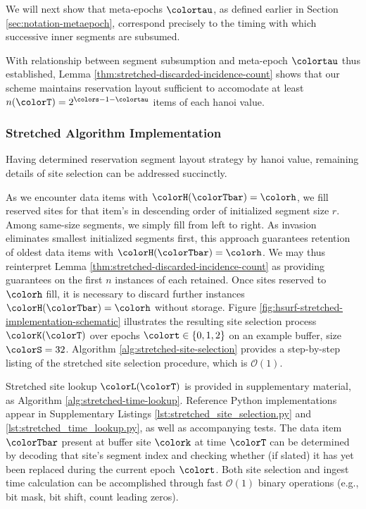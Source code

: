 We will next show that meta-epochs $\colortau$, as defined earlier in Section \ref{sec:notation-metaepoch}, correspond precisely to the timing with which successive inner segments are subsumed.



With relationship between segment subsumption and meta-epoch $\colortau$ thus established, Lemma \ref{thm:stretched-discarded-incidence-count} shows that our scheme maintains reservation layout sufficient to accomodate at least $n(\colorT) = 2^{\colors - 1 - \colortau}$ items of each hanoi value.

\subsubsection{Stretched Algorithm Implementation}
\label{sec:stretched-implementation}

Having determined reservation segment layout strategy by hanoi value, remaining details of site selection can be addressed succinctly.

As we encounter data items with $\colorH(\colorTbar) = \colorh$, we fill reserved sites for that item's \hv{} in descending order of initialized segment size $r$.
Among same-size segments, we simply fill from left to right.
As invasion eliminates smallest initialized segments first, this approach guarantees retention of oldest data items with $\colorH(\colorTbar) = \colorh$.
We may thus reinterpret Lemma \ref{thm:stretched-discarded-incidence-count} as providing guarantees on the first $n$ instances of each \hv{} retained.
Once sites reserved to \hv{} $\colorh$ fill, it is necessary to discard further instances $\colorH(\colorTbar) = \colorh$ without storage.
Figure \ref{fig:hsurf-stretched-implementation-schematic} illustrates the resulting site selection process $\colorK(\colorT)$ over epochs $\colort \in \{0,1,2\}$ on an example buffer, size $\colorS=32$.
Algorithm \ref{alg:stretched-site-selection} provides a step-by-step listing of the stretched site selection procedure, which is $\mathcal{O}(1)$.



Stretched site lookup $\colorL(\colorT)$ is provided in supplementary material, as Algorithm \ref{alg:stretched-time-lookup}.
Reference Python implementations appear in Supplementary Listings \ref{lst:stretched_site_selection.py} and \ref{lst:stretched_time_lookup.py}, as well as accompanying tests.
The data item $\colorTbar$ present at buffer site $\colork$ at time $\colorT$ can be determined by decoding that site's segment index and checking whether (if slated) it has yet been replaced during the current epoch $\colort$.
Both site selection and ingest time calculation can be accomplished through fast $\mathcal{O}(1)$ binary operations (e.g., bit mask, bit shift, count leading zeros).

